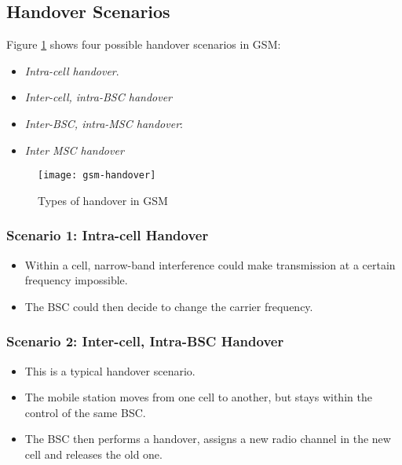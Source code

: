 \subsection{Handover Scenarios}
Figure \ref{fig:gsm-handover} shows four possible handover scenarios in GSM:

\begin{itemize}
	\item \textit{Intra-cell handover}.	
	\item \textit{Inter-cell, intra-BSC handover}
	\item \textit{Inter-BSC, intra-MSC handover}:
	\item \textit{Inter MSC handover}
\end{itemize}

\begin{figure}[ht!]
	\vspace*{0.2cm}
	\centering
	\texttt{[image: gsm-handover]}
	\caption{Types of handover in GSM}\label{fig:gsm-handover}
\end{figure}

\subsubsection[Intra-cell Handover]{Scenario 1: Intra-cell Handover}
\begin{itemize}
	\item Within a cell, narrow-band interference could make transmission at a certain frequency impossible. 
	\item The BSC could then decide to change the carrier frequency.
\end{itemize}

\subsubsection[Inter-cell, Intra-BSC Handover]{Scenario 2: Inter-cell, Intra-BSC Handover}
\begin{itemize}
	\item This is a typical handover scenario. 
	\item The mobile station moves from one cell to another, but stays within the control of the same BSC. 
	\item The BSC then performs a handover, assigns a new radio channel in the new cell and releases the old one.
\end{itemize}


